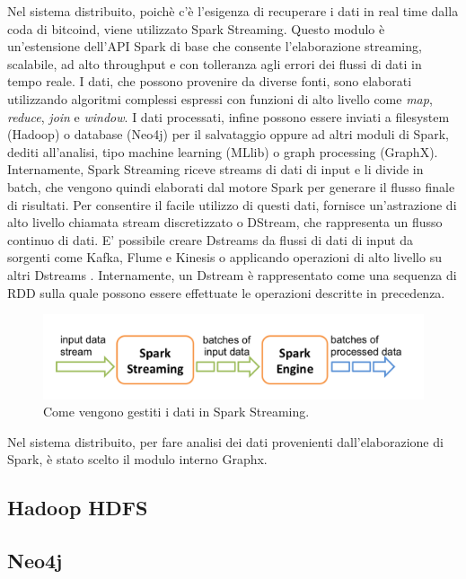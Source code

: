 Nel sistema distribuito, poichè c'è l'esigenza di recuperare i dati in real time dalla coda di bitcoind, viene utilizzato Spark Streaming. Questo modulo è un'estensione dell'API Spark di base che consente l'elaborazione streaming, scalabile, ad alto throughput e con tolleranza agli errori dei flussi di dati in tempo reale. I dati, che possono provenire da diverse fonti, sono elaborati utilizzando algoritmi complessi espressi con funzioni di alto livello come \textit{map}, \textit{reduce}, \textit{join} e \textit{window}. I dati processati, infine possono essere inviati a filesystem (Hadoop) o database (Neo4j) per il salvataggio oppure ad altri moduli di Spark, dediti all'analisi, tipo machine learning (MLlib) o graph processing (GraphX). 
\\Internamente, Spark Streaming riceve streams di dati di input e li divide in batch, che vengono quindi elaborati dal motore Spark per generare il flusso finale di risultati. Per consentire il facile utilizzo di questi dati, fornisce un'astrazione di alto livello chiamata stream discretizzato o DStream, che rappresenta un flusso continuo di dati. E' possibile creare Dstreams da flussi di dati di input da sorgenti come Kafka, Flume e Kinesis o applicando operazioni di alto livello su altri Dstreams \cite{spark:home-streaming}. Internamente, un Dstream è rappresentato come una sequenza di RDD sulla quale possono essere effettuate le operazioni descritte in precedenza.
\begin{figure}[H]
	\centering
	\includegraphics[width=\textwidth]{images/streamingSpark.png}
	\caption{Come vengono gestiti i dati in Spark Streaming.}
	\label{fig:streamingSpark}
\end{figure}

Nel sistema distribuito, per fare analisi dei dati provenienti dall'elaborazione di Spark, è stato scelto il modulo interno Graphx.


\subsection{Hadoop HDFS}
\label{sec:hadoop HDFS}

\subsection{Neo4j}
\label{sec:neo4j}


